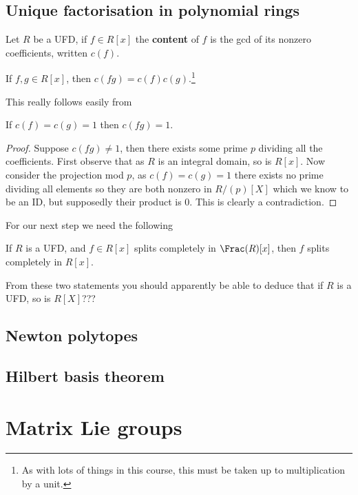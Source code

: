 \documentclass{article}
\begin{document}
\subsection{Unique factorisation in polynomial rings}

\begin{definition}
    Let $R$ be a UFD, if $f\in R[x]$ the \textbf{content} of $f$ is the gcd of its nonzero coefficients, written $c(f)$.
\end{definition}

\begin{lemma}
    If $f,g\in R[x]$, then $c(fg)=c(f)c(g)$.\footnote{As with lots of things in this course, this must be taken up to multiplication by a unit.}
\end{lemma}

This really follows easily from

\begin{lemma}
    If $c(f)=c(g)=1$ then $c(fg)=1$.
    \begin{proof}
        Suppose $c(fg)\neq 1$, then there exists some prime $p$ dividing all the coefficients. First observe that as $R$ is an integral domain, so is $R[x]$. Now consider the projection mod $p$, as $c(f)=c(g)=1$ there exists no prime dividing all elements so they are both nonzero in $R/(p)[X]$ which we know to be an ID, but supposedly their product is $0$. This is clearly a contradiction.
    \end{proof}
\end{lemma}

For our next step we need the following 

\begin{theorem}
    If $R$ is a UFD, and $f\in R[x]$ splits completely in $\Frac(R)[x]$, then $f$ splits completely in $R[x]$.
\end{theorem}

From these two statements you should apparently be able to deduce that if $R$ is a UFD, so is $R[X]$???

\subsection{Newton polytopes}

\subsection{Hilbert basis theorem}

\section{Matrix Lie groups}
\end{document}
